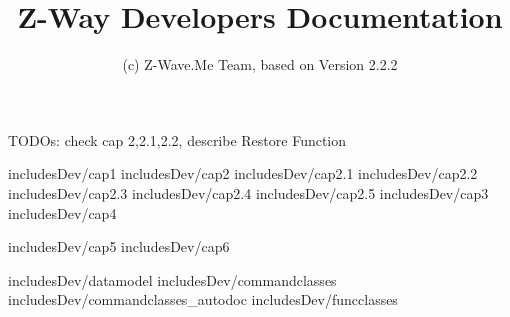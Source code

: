 \documentclass[10pt]{book}
\title{Z-Way Developers Documentation}
\author{(c) Z-Wave.Me Team, based on Version 2.2.2}
\date{}
\begin{document}
\maketitle
\tableofcontents


TODOs: check cap 2,2.1,2.2, describe Restore Function 

 {includesDev/cap1} 
 {includesDev/cap2} %
 {includesDev/cap2.1} %
 {includesDev/cap2.2} %
 {includesDev/cap2.3} %
 {includesDev/cap2.4} %
 {includesDev/cap2.5} %
 {includesDev/cap3} %
 {includesDev/cap4} %

 {includesDev/cap5} %
 {includesDev/cap6} %

 {includesDev/datamodel}
 {includesDev/commandclasses}
 {includesDev/commandclasses_autodoc}
 {includesDev/funcclasses}
\end{document}
